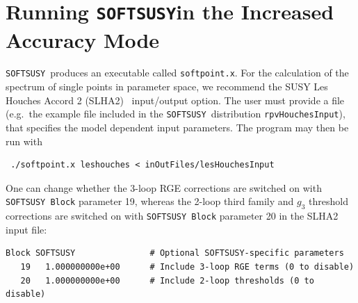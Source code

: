 \documentclass[final,3p,times,pdflatex]{elsarticle}
\def\SOFTSUSY{{\tt SOFTSUSY}}
\def\code#1{\small{\tt #1}\normalsize}
\begin{document}
\section{Running \SOFTSUSY in the Increased Accuracy Mode} 
\label{sec:run}

\SOFTSUSY~produces an executable called \code{softpoint.x}. For the calculation
of the spectrum of single points in parameter space, we recommend the
SUSY Les Houches Accord 2 (SLHA2)~\cite{Allanach:2008qq}  input/output
option. The user must provide a file (e.g.\ the example file included
in the \SOFTSUSY~distribution
\code{rpvHouchesInput}), that specifies the model dependent input
parameters. The program may then be run with
\small
\begin{verbatim}
 ./softpoint.x leshouches < inOutFiles/lesHouchesInput
\end{verbatim}
\normalsize

One can change whether the 3-loop RGE corrections are switched on with
\code{SOFTSUSY Block} parameter 19, whereas the 2-loop third family and $g_3$
threshold corrections 
are switched on with \code{SOFTSUSY Block} parameter 20 in the SLHA2 input file:
\small
\begin{verbatim}
Block SOFTSUSY               # Optional SOFTSUSY-specific parameters
   19   1.000000000e+00      # Include 3-loop RGE terms (0 to disable)
   20   1.000000000e+00      # Include 2-loop thresholds (0 to disable)
\end{verbatim}
\normalsize



\end{document}
